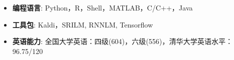   \begin{itemize}[leftmargin=*]
    \item \textbf{编程语言}: Python，R，Shell，MATLAB，C/C++，Java
    
    \item \textbf{工具包}: Kaldi，SRILM, RNNLM, Tensorflow

    \item \textbf{英语能力}: 全国大学英语：四级(604)，六级(556)，清华大学英语水平：96.75/120
  \end{itemize}